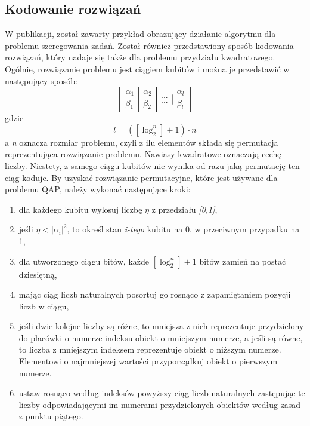 \subsection{Kodowanie rozwiązań}
W publikacji, został zawarty przykład obrazujący działanie algorytmu dla problemu szeregowania zadań. Został również przedstawiony sposób kodowania rozwiązań, który nadaje się także dla problemu przydziału kwadratowego. Ogólnie, rozwiązanie problemu jest ciągiem kubitów i można je przedstawić w następujący sposób:
\newline
\begin{equation}
\left[ \begin{array}{ccc} \alpha_1 \\ \beta_1 \end{array} \right| \left. \begin{array}{ccc} \alpha_2 \\ \beta_2 \end{array}  \right| \left. \begin{array}{ccc} ... \\ ... \end{array}  \right| \left. \begin{array}{ccc} \alpha_l \\ \beta_l \end{array}  \right]
\end{equation}
\newline
gdzie 
\newline
\begin{equation}
l=([\log_2^n] + 1)\cdot n
\end{equation}
\newline
a \textit{n} oznacza rozmiar problemu, czyli z ilu elementów składa się permutacja reprezentująca rozwiązanie problemu. Nawiasy kwadratowe oznaczają cechę liczby.
Niestety, z samego ciągu kubitów nie wynika od razu jaką permutację ten ciąg koduje. By uzyskać rozwiązanie permutacyjne, które jest używane dla problemu QAP, należy wykonać następujące kroki:
\begin{enumerate}
\item dla każdego kubitu wylosuj liczbę $\eta$ z przedziału \textit{[0,1]},
\item jeśli $\eta < |\alpha_i|^2$, to określ stan \textit{i-tego} kubitu na 0, w przeciwnym przypadku na 1,
\item dla utworzonego ciągu bitów, każde $[\log_2^n] + 1$ bitów zamień na postać dziesiętną,
\item mając ciąg liczb naturalnych posortuj go rosnąco z zapamiętaniem pozycji liczb w ciągu,
\item jeśli dwie kolejne liczby są różne, to mniejsza z nich reprezentuje przydzielony do placówki o numerze indeksu obiekt o mniejszym numerze, a jeśli są równe, to liczba z mniejszym indeksem reprezentuje obiekt o niższym numerze. Elementowi o najmniejszej wartości przyporządkuj obiekt o pierwszym numerze.
\item ustaw rosnąco według indeksów powyższy ciąg liczb naturalnych zastępując te liczby odpowiadającymi im numerami przydzielonych obiektów według zasad z punktu piątego.
\end{enumerate}
